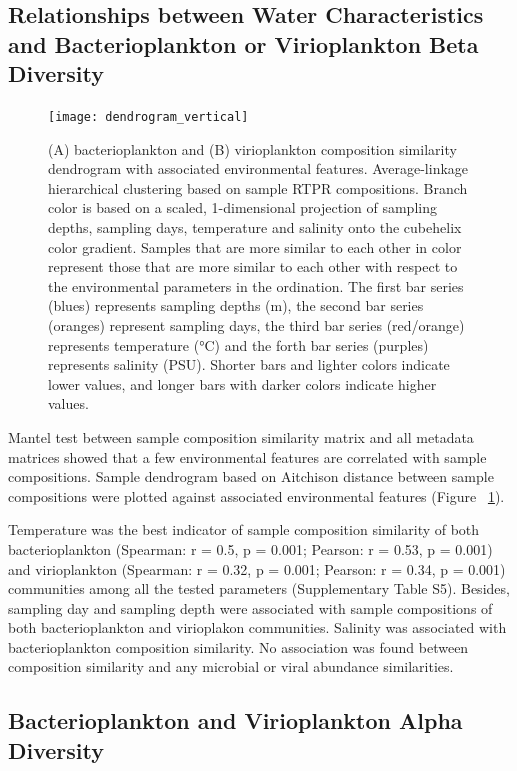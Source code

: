 \documentclass[a4,center,fleqn]{NAR}
\begin{document}
\subsection{Relationships between Water Characteristics and Bacterioplankton or Virioplankton Beta Diversity}

\begin{figure}[t]
\begin{center}
\texttt{[image: dendrogram\_vertical]}
\end{center}
\caption{(A) bacterioplankton and (B) virioplankton composition similarity dendrogram with associated environmental features. Average-linkage hierarchical clustering based on sample RTPR compositions.  Branch color is based on a scaled, 1-dimensional projection of sampling depths, sampling days, temperature and salinity onto the cubehelix color gradient.  Samples that are more similar to each other in color represent those that are more similar to each other with respect to the environmental parameters in the ordination.  The first bar series (blues) represents sampling depths (m), the second bar series (oranges) represent sampling days, the third bar series (red/orange) represents temperature (°C) and the forth bar series (purples) represents salinity (PSU).  Shorter bars and lighter colors indicate lower values, and longer bars with darker colors indicate higher values.
}
\label{dendrogram} 
\end{figure}

Mantel test between sample composition similarity matrix and all metadata matrices showed that a few environmental features are correlated with sample compositions.
Sample dendrogram based on Aitchison distance between sample compositions were plotted against associated environmental features (Figure~ \ref{dendrogram}).

Temperature was the best indicator of sample composition similarity of both bacterioplankton (Spearman: r = 0.5, p = 0.001; Pearson: r = 0.53, p = 0.001) and virioplankton (Spearman: r = 0.32, p = 0.001; Pearson: r = 0.34, p = 0.001) communities among all the tested parameters (Supplementary Table S5).
Besides, sampling day and sampling depth were associated with sample compositions of both bacterioplankton and virioplakon communities.
Salinity was associated with bacterioplankton composition similarity.
No association was found between composition similarity and any microbial or viral abundance similarities.

\subsection{Bacterioplankton and Virioplankton Alpha Diversity}
\end{document}

